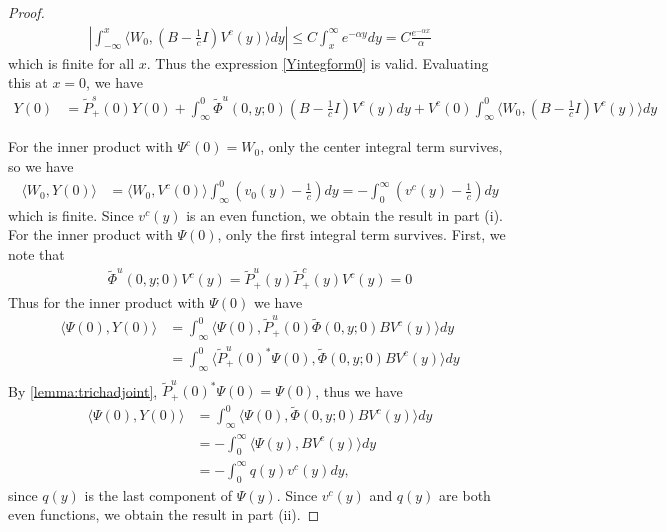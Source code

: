 \documentclass[thesis.tex]{subfiles}
\begin{document}
\begin{lemma}
\begin{proof}
\begin{align*}
\left| \int_{-\infty}^x \langle W_0, \left( B - \frac{1}{c}I \right) V^c(y) \rangle dy \right| 
\leq C \int_x^{\infty} e^{-\alpha y} dy = C \frac{e^{-\alpha x}}{\alpha}
\end{align*}
which is finite for all $x$. Thus the expression \cref{Yintegform0} is valid. Evaluating this at $x = 0$, we have
\begin{equation}\label{Yintegform0}
\begin{aligned}
Y(0) &= \tilde{P}^s_+(0) Y(0) 
+ \int_{\infty}^0 \tilde{\Phi}^u(0,y; 0)\left( B - \frac{1}{c}I \right) V^c(y) dy + V^c(0) \int_{\infty}^0 \langle W_0, \left( B - \frac{1}{c}I \right) V^c(y) \rangle dy 
\end{aligned}
\end{equation}

For the inner product with $\Psi^c(0) = W_0$, only the center integral term survives, so we have
\begin{align*}
\langle W_0, Y(0) \rangle
&= \langle W_0, V^c(0) \rangle \int_{\infty}^0 \left(v_0(y) - \frac{1}{c}\right) dy 
= -\int_0^{\infty} \left(v^c(y) - \frac{1}{c}\right) dy 
\end{align*}
which is finite. Since $v^c(y)$ is an even function, we obtain the result in part (i). For the inner product with $\Psi(0)$, only the first integral term survives. First, we note that 
\begin{align*}
\tilde{\Phi}^u(0,y; 0) V^c(y) = \tilde{P}_+^u(y) \tilde{P}_+^c(y)V^c(y) = 0
\end{align*}
Thus for the inner product with $\Psi(0)$ we have
\begin{align*}
\langle \Psi(0), Y(0) \rangle
&= \int_{\infty}^0 \langle \Psi(0), \tilde{P}_+^u(0) \tilde{\Phi}(0,y; 0) B V^c(y) \rangle dy \\
&= \int_{\infty}^0 \langle \tilde{P}_+^u(0)^*\Psi(0), \tilde{\Phi}(0,y; 0) B V^c(y) \rangle dy \\
\end{align*}
By \cref{lemma:trichadjoint}, $\tilde{P}_+^u(0)^*\Psi(0) = \Psi(0)$, thus we have
\begin{align*}
\langle \Psi(0), Y(0) \rangle
&= \int_{\infty}^0 \langle \Psi(0), \tilde{\Phi}(0,y; 0) B V^c(y) \rangle dy \\
&= -\int_0^\infty \langle \Psi(y), B V^c(y) \rangle dy \\
&=-\int_0^\infty q(y) v^c(y) dy,
\end{align*}
since $q(y)$ is the last component of $\Psi(y)$. Since $v^c(y)$ and $q(y)$ are both even functions, we obtain the result in part (ii).
\end{proof}
\end{lemma}
\end{document}
